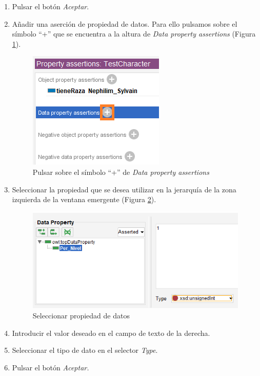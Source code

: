 \begin{enumerate}
    \item Pulsar el botón \textit{Aceptar}.

    \item Añadir una aserción de propiedad de datos. Para ello pulsamos sobre el símbolo “+” que se encuentra a la altura de 
    \textit{Data property assertions} (Figura \ref*{AddProperties_4}).
    \begin{figure}[ht]
        \centering
        \includegraphics[scale=0.6]{Figures/Protege/AddProperties_4.png}
        \caption{Pulsar sobre el símbolo “+” de \textit{Data property assertions}}
        \label{AddProperties_4}
    \end{figure}

    \item Seleccionar la propiedad que se desea utilizar en la jerarquía de la zona izquierda de la ventana emergente 
    (Figura \ref*{AddProperties_5}).
    \begin{figure}[ht]
        \centering
        \includegraphics[scale=0.6]{Figures/Protege/AddProperties_5.png}
        \caption{Seleccionar propiedad de datos}
        \label{AddProperties_5}
    \end{figure}

    \item Introducir el valor deseado en el campo de texto de la derecha.
    \item Seleccionar el tipo de dato en el selector \textit{Type}.
    \item Pulsar el botón \textit{Aceptar.}

\end{enumerate}

